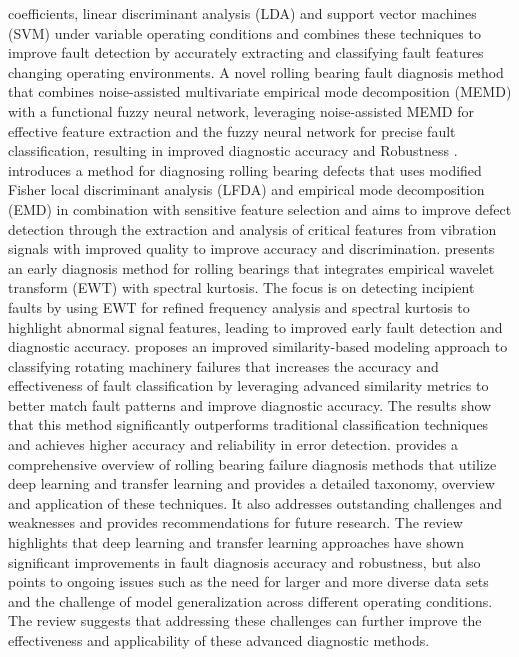 \documentclass[sn-basic,pdflatex]{sn-jnl}
\theoremstyle{remark}
\theoremstyle{definition}
\begin{document}
coefficients, linear discriminant analysis (LDA) and support vector
machines (SVM) under variable operating conditions and combines these
techniques to improve fault detection by accurately extracting and
classifying fault features changing operating environments. A novel
rolling bearing fault diagnosis method that combines noise-assisted
multivariate empirical mode decomposition (MEMD) with a functional fuzzy
neural network, leveraging noise-assisted MEMD for effective feature
extraction and the fuzzy neural network for precise fault
classification, resulting in improved diagnostic accuracy and Robustness
\citep{WOS:000434717400001}. \citet{WOS:000426284100001} introduces a
method for diagnosing rolling bearing defects that uses modified Fisher
local discriminant analysis (LFDA) and empirical mode decomposition
(EMD) in combination with sensitive feature selection and aims to
improve defect detection through the extraction and analysis of critical
features from vibration signals with improved quality to improve
accuracy and discrimination. \citet{WOS:000539546400083} presents an
early diagnosis method for rolling bearings that integrates empirical
wavelet transform (EWT) with spectral kurtosis. The focus is on
detecting incipient faults by using EWT for refined frequency analysis
and spectral kurtosis to highlight abnormal signal features, leading to
improved early fault detection and diagnostic accuracy.
\citet{WOS:000426986200020} proposes an improved similarity-based
modeling approach to classifying rotating machinery failures that
increases the accuracy and effectiveness of fault classification by
leveraging advanced similarity metrics to better match fault patterns
and improve diagnostic accuracy. The results show that this method
significantly outperforms traditional classification techniques and
achieves higher accuracy and reliability in error detection.
\citet{hakim2023systematic} provides a comprehensive overview of rolling
bearing failure diagnosis methods that utilize deep learning and
transfer learning and provides a detailed taxonomy, overview and
application of these techniques. It also addresses outstanding
challenges and weaknesses and provides recommendations for future
research. The review highlights that deep learning and transfer learning
approaches have shown significant improvements in fault diagnosis
accuracy and robustness, but also points to ongoing issues such as the
need for larger and more diverse data sets and the challenge of model
generalization across different operating conditions. The review
suggests that addressing these challenges can further improve the
effectiveness and applicability of these advanced diagnostic methods.
\end{document}
